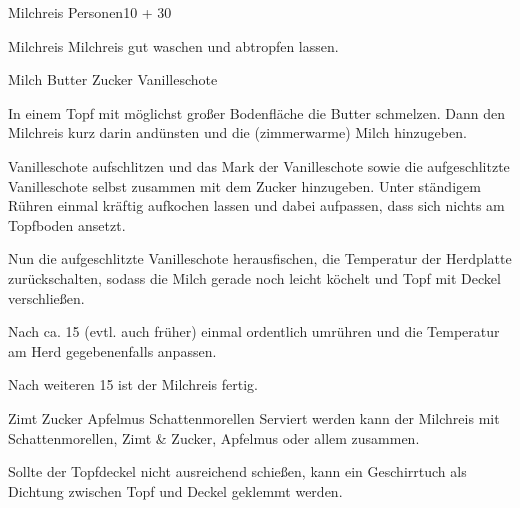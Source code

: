 \begin{MyRecipe}{Milchreis}{ Personen}{\SI{10}{\minuteprime} + \SI{30}{\minuteprime}}
	
	\ingredient[\Calc{0.25}{\x}]{\si{\kilogram}} {Milchreis}
	Milchreis gut waschen und abtropfen lassen.\par\bigskip

	\ingredient[\Calc{1}{\x}]{\si{\liter}} {Milch}
	\ingredient[\Calc{1}{\x}]{\si{\Essloeffel}} {Butter}
	\ingredient[\Calc{4}{\x}]{\si{\Essloeffel}} {Zucker}
	\ingredient[\Calc{1}{\x}]{} {Vanilleschote}
	
	In einem Topf mit möglichst großer Bodenfläche die Butter schmelzen. Dann den Milchreis kurz darin andünsten und die (zimmerwarme) Milch hinzugeben. 
	
	Vanilleschote aufschlitzen und das Mark der Vanilleschote sowie die aufgeschlitzte Vanilleschote selbst zusammen mit dem Zucker hinzugeben. Unter ständigem Rühren einmal kräftig aufkochen lassen und dabei aufpassen,
	dass sich nichts am Topfboden ansetzt.\par\bigskip
	
	Nun die aufgeschlitzte Vanilleschote herausfischen, die Temperatur der Herdplatte zurückschalten, sodass die Milch gerade noch leicht köchelt und Topf mit Deckel verschließen.
	
	Nach ca. \SI{15}{\minuteprime} (evtl. auch früher) einmal ordentlich umrühren und die Temperatur am Herd gegebenenfalls anpassen.
	
	Nach weiteren \SI{15}{\minuteprime} ist der Milchreis fertig.\par\bigskip
	
	\ingredient[]{} {Zimt}
	\ingredient[]{} {Zucker}
	\ingredient[]{} {Apfelmus}
	\ingredient[]{} {Schattenmorellen}
	Serviert werden kann der Milchreis mit Schattenmorellen, Zimt \& Zucker, Apfelmus oder allem zusammen.\par\bigskip
		
	Sollte der Topfdeckel nicht ausreichend schießen, kann ein Geschirrtuch als Dichtung zwischen Topf und Deckel geklemmt werden.
	
	
	
	
	
	
	
\end{MyRecipe}